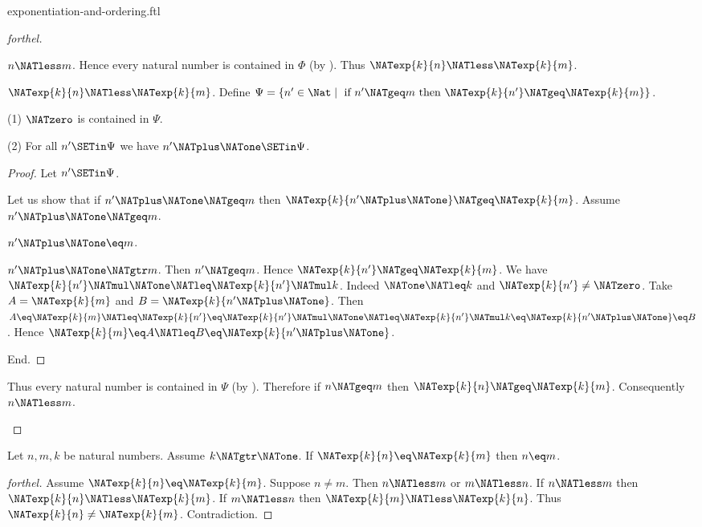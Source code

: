 \documentclass{stex}
\begin{document}
\begin{smodule}{exponentiation-and-ordering.ftl}
\begin{proof}[forthel]
\begin{case}{$n \NATless m$.}
    Hence every natural number is contained in $\Phi$ (by ).
    Thus $\NATexp{k}{n} \NATless \NATexp{k}{m}$.
  \end{case}

  \begin{case}{$\NATexp{k}{n} \NATless \NATexp{k}{m}$.}
    Define $\Psi = \{ n' \in \Nat \mid\text{ if }n' \NATgeq m\text{ then }
    \NATexp{k}{n'} \NATgeq \NATexp{k}{m} \}$.

    (1) $\NATzero$ is contained in $\Psi$.

    (2) For all $n' \SETin \Psi$ we have $n' \NATplus \NATone \SETin \Psi$.
    \begin{proof}
      Let $n' \SETin \Psi$.

      Let us show that if $n' \NATplus \NATone \NATgeq m$ then $\NATexp{k}{n' \NATplus \NATone} \NATgeq \NATexp{k}{m}$.
        Assume $n' \NATplus \NATone \NATgeq m$.

        \begin{case}{$n' \NATplus \NATone \eq m$.} \end{case}

        \begin{case}{$n' \NATplus \NATone \NATgtr m$.}
          Then $n' \NATgeq m$.
          Hence $\NATexp{k}{n'} \NATgeq \NATexp{k}{m}$.
          We have $\NATexp{k}{n'} \NATmul \NATone \NATleq \NATexp{k}{n'} \NATmul k$.
          Indeed $\NATone \NATleq k$ and $\NATexp{k}{n'} \neq \NATzero$.
          Take $A = \NATexp{k}{m}$ and $B = \NATexp{k}{n' \NATplus \NATone}$. %
          Then $A
            \eq \NATexp{k}{m}
            \NATleq \NATexp{k}{n'}
            \eq \NATexp{k}{n'} \NATmul \NATone
            \NATleq \NATexp{k}{n'} \NATmul k
            \eq \NATexp{k}{n' \NATplus \NATone}
            \eq B$.
          Hence $\NATexp{k}{m} \eq A \NATleq B \eq \NATexp{k}{n' \NATplus \NATone}$.
        \end{case}
      End.
    \end{proof}

    Thus every natural number is contained in $\Psi$ (by ).
    Therefore if $n \NATgeq m$ then $\NATexp{k}{n} \NATgeq \NATexp{k}{m}$.
    Consequently $n \NATless m$.
  \end{case}
\end{proof}

\begin{corollary}[forthel,id=ARITHMETIC_09_6780506905509888]
  Let $n, m, k$ be natural numbers.
  Assume $k \NATgtr \NATone$.
  If $\NATexp{k}{n} \eq \NATexp{k}{m}$ then $n \eq m$.
\end{corollary}
\begin{proof}[forthel]
  Assume $\NATexp{k}{n} \eq \NATexp{k}{m}$.
  Suppose $n \neq m$.
  Then $n \NATless m$ or $m \NATless n$.
  If $n \NATless m$ then $\NATexp{k}{n} \NATless \NATexp{k}{m}$.
  If $m \NATless n$ then $\NATexp{k}{m} \NATless \NATexp{k}{n}$.
  Thus $\NATexp{k}{n} \neq \NATexp{k}{m}$.
  Contradiction.
\end{proof}


\end{smodule}
\end{document}
